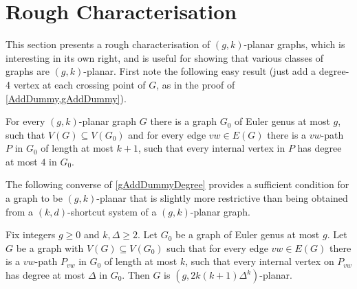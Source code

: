 \documentclass{patmorin}
\newcommand{\notex}[2]{}
\newcommand{\PP}{\mathcal{P}}
\renewcommand{\geq}{\geqslant}
\begin{document}
\section{Rough Characterisation}
\label{Characterisation}

This section presents a rough characterisation of $(g,k)$-planar graphs, which is interesting in its own right, and is useful for showing that various classes of graphs are $(g,k)$-planar. First note the following easy result (just add a degree-4 vertex at each crossing point of $G$, as in the proof of \cref{AddDummy,gAddDummy}). 

\begin{lem}
\label{gAddDummyDegree}
For every $(g,k)$-planar graph $G$ there is a graph $G_0$ of Euler
genus at most $g$, such that $V(G) \subseteq V(G_0)$ and for every
edge $vw \in E(G)$ there is a $vw$-path $P$ in $G_0$ of length at most
$k+1$, such that every internal vertex in $P$ has degree at most $4$
in $G_0$.
\end{lem}



The following converse of \cref{gAddDummyDegree} provides a sufficient condition for a graph to be $(g,k)$-planar that is slightly more restrictive than being obtained from a $(k,d)$-shortcut system of a $(g,k)$-planar graph. \notex{DW}{Is this sentence clear enough?}\notex{PM}{Sure.}

\begin{lem} 
\label{DrawG}
Fix integers $g\geq 0$ and $k,\Delta\geq 2$. 
Let $G_0$ be a graph of Euler genus at most $g$. Let $G$ be
a graph with $V(G) \subseteq V(G_0)$ such that for every edge $vw \in
E(G)$ there is a $vw$-path $P_{vw}$ in $G_0$ of length at most $k$, such
that every internal vertex on $P_{vw}$ has degree at most $\Delta$ in
$G_0$. Then $G$ is $(g, 2k(k+1)\Delta^{k} )$-planar.
\end{lem}
\end{document}
